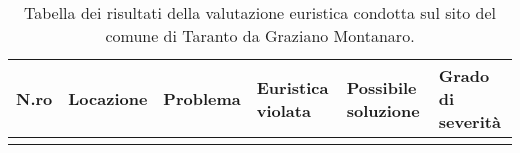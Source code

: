 \begin{longtable}[c]{@{}m{1cm}llllm{2cm}@{}}
	\caption{Tabella dei risultati della valutazione euristica condotta sul sito del comune di Taranto da Graziano Montanaro.}
	\label{tab:val-euristica-GrazianoMontanaro}\\
	\toprule
	N.ro & Locazione & Problema & Euristica violata & Possibile soluzione & Grado di severità\footnotemark \\* \midrule
	\endhead
\\*
	\bottomrule
\end{longtable}
